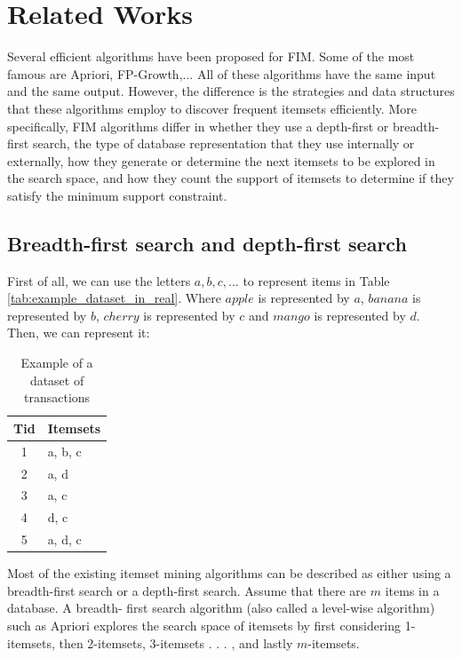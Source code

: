 \section{Related Works}
Several efficient algorithms have been proposed for
FIM. Some of the most famous are Apriori\cite{apriori}, FP-Growth\cite{fp_growth},...
All of these algorithms have the same input and the same output. However, the difference is
the strategies and data structures that these algorithms employ to discover frequent itemsets
efficiently. More specifically, FIM algorithms differ in whether they use a depth-first or
breadth-first search, the type of database representation that they use internally or
externally, how they generate or determine the next itemsets to be explored in the search
space, and how they count the support of itemsets to determine if they satisfy the
minimum support constraint.

\subsection{Breadth-first search and depth-first search}
First of all, we can use the letters $a, b, c,...$ to represent items in Table \ref{tab:example_dataset_in_real}.
Where $apple$ is represented by $a$, $banana$ is represented by $b$, $cherry$ is represented by $c$ and $mango$ is represented by $d$.
Then, we can represent it:
\begin{table}[H]
    \centering
    \caption{Example of a dataset of transactions}
    \label{tab:example_dataset_in_real_encode}
    \begin{tabular}{|c|l|}
        \hline
        \textbf{Tid} & \textbf{Itemsets} \\
        \hline
        1            & a, b, c           \\
        2            & a, d              \\
        3            & a, c              \\
        4            & d, c              \\
        5            & a, d, c           \\
        \hline
    \end{tabular}
\end{table}

Most of the existing itemset mining algorithms can be described as either using a breadth-first
search or a depth-first search. Assume that there are $m$ items in a database. A breadth-
first search algorithm (also called a level-wise algorithm) such as Apriori\cite{apriori} explores the search
space of itemsets by first considering 1-itemsets, then 2-itemsets, 3-itemsets . . . , and lastly
$m$-itemsets.

